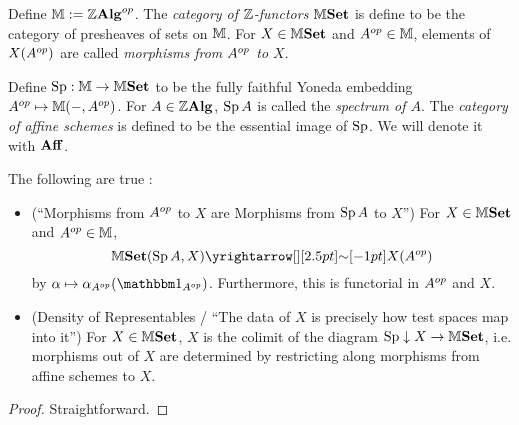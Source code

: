\documentclass[../main.tex]{subfiles}
\begin{document}
  
\begin{dfn}[$\Z$-Functor]

  Define $\mathbb{M} := \mathbb{Z}\mathbf{Alg}^{op}$.
  The \emph{category of $\Z$-functors}
  $\mathbb{M}\mathbf{Set}$ is define to be the category of 
  presheaves of sets on $\mathbb{M}$. 
  For $X \in \mathbb{M}\mathbf{Set}$ and $A^{op} \in \mathbb{M}$,
  elements of $X(A^{op})$ are called 
  \emph{morphisms from $A^{op}$ to $X$}.

  Define $\operatorname{Sp} : \mathbb{M} \to \mathbb{M}\mathbf{Set}$ to be 
  the fully faithful Yoneda embedding $A^{op} \mapsto \mathbb{M}(-,A^{op})$.
  For $A \in \mathbb{Z}\mathbf{Alg}$, $\operatorname{Sp} A$ is called the \emph{spectrum of $A$}.
  The \emph{category of affine schemes} is defined to be 
  the essential image of $\operatorname{Sp}$.
  We will denote it with $\mathbf{Aff}$.
\end{dfn}

\begin{prop}[Yoneda]
  
  The following are true : 
  \begin{itemize}
    \item (``Morphisms from $A^{op}$ to $X$ are Morphisms from $\operatorname{Sp} A$ to $X$'') 
    For $X \in \mathbb{M}\mathbf{Set}$ and $A^{op} \in \mathbb{M}$,
    \[
      \M\SET(\SP A, X) \map{\sim}{} X(A\op)
    \]
    by $\al \mapsto \al_{A\op}(\id{A\op})$.
    Furthermore, this is functorial in $A^{op}$ and $X$.
    \item (Density of Representables 
    / ``The data of $X$ is precisely how test spaces map into it'') 
    For $X \in \mathbb{M}\mathbf{Set}$,
    $X$ is the colimit of the diagram $\operatorname{Sp} \downarrow X \to \mathbb{M}\mathbf{Set}$,
    i.e. morphisms out of $X$ are determined by restricting along 
    morphisms from affine schemes to $X$.
  \end{itemize}
  
\end{prop}
\begin{proof}
  Straightforward.
\end{proof}
\end{document}

